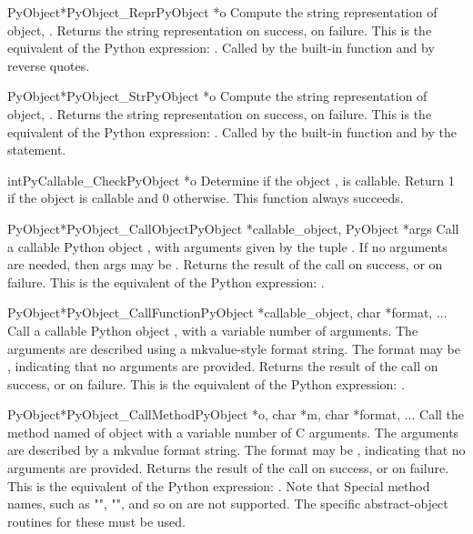 \documentclass[twoside,openright]{report}
\begin{document}
\begin{cfuncdesc}{PyObject*}{PyObject_Repr}{PyObject *o}
Compute the string representation of object, .  Returns the
string representation on success, \NULL{} on failure.  This is
the equivalent of the Python expression: .
Called by the  built-in function and by reverse quotes.
\end{cfuncdesc}


\begin{cfuncdesc}{PyObject*}{PyObject_Str}{PyObject *o}
Compute the string representation of object, .  Returns the
string representation on success, \NULL{} on failure.  This is
the equivalent of the Python expression: .
Called by the  built-in function and by the 
statement.
\end{cfuncdesc}


\begin{cfuncdesc}{int}{PyCallable_Check}{PyObject *o}
Determine if the object , is callable.  Return 1 if the
object is callable and 0 otherwise.
This function always succeeds.
\end{cfuncdesc}


\begin{cfuncdesc}{PyObject*}{PyObject_CallObject}{PyObject *callable_object, PyObject *args}
Call a callable Python object , with
arguments given by the tuple .  If no arguments are
needed, then args may be \NULL{}.  Returns the result of the
call on success, or \NULL{} on failure.  This is the equivalent
of the Python expression: .
\end{cfuncdesc}

\begin{cfuncdesc}{PyObject*}{PyObject_CallFunction}{PyObject *callable_object, char *format, ...}
Call a callable Python object , with a
variable number of \C{} arguments. The \C{} arguments are described
using a mkvalue-style format string. The format may be \NULL{},
indicating that no arguments are provided.  Returns the
result of the call on success, or \NULL{} on failure.  This is
the equivalent of the Python expression: .
\end{cfuncdesc}


\begin{cfuncdesc}{PyObject*}{PyObject_CallMethod}{PyObject *o, char *m, char *format, ...}
Call the method named  of object  with a variable number of
C arguments.  The \C{} arguments are described by a mkvalue
format string.  The format may be \NULL{}, indicating that no
arguments are provided. Returns the result of the call on
success, or \NULL{} on failure.  This is the equivalent of the
Python expression: .
Note that Special method names, such as "",
"", and so on are not supported. The specific
abstract-object routines for these must be used.
\end{cfuncdesc}
\end{document}
